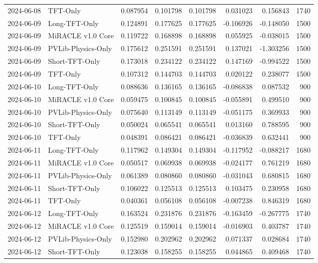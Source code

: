 \begin{tabular}{llrrrrrr}
2024-06-08 & TFT-Only & 0.087954 & 0.101798 & 0.101798 & 0.031023 & 0.156843 & 1740 \\
2024-06-09 & Long-TFT-Only & 0.124891 & 0.177625 & 0.177625 & -0.106926 & -0.148050 & 1500 \\
2024-06-09 & MiRACLE v1.0 Core & 0.119722 & 0.168898 & 0.168898 & 0.055925 & -0.038015 & 1500 \\
2024-06-09 & PVLib-Physics-Only & 0.175612 & 0.251591 & 0.251591 & 0.137021 & -1.303256 & 1500 \\
2024-06-09 & Short-TFT-Only & 0.173018 & 0.234122 & 0.234122 & 0.147169 & -0.994522 & 1500 \\
2024-06-09 & TFT-Only & 0.107312 & 0.144703 & 0.144703 & 0.020122 & 0.238077 & 1500 \\
2024-06-10 & Long-TFT-Only & 0.088636 & 0.136165 & 0.136165 & -0.086838 & 0.087532 & 900 \\
2024-06-10 & MiRACLE v1.0 Core & 0.059475 & 0.100845 & 0.100845 & -0.055891 & 0.499510 & 900 \\
2024-06-10 & PVLib-Physics-Only & 0.075640 & 0.113149 & 0.113149 & -0.051175 & 0.369933 & 900 \\
2024-06-10 & Short-TFT-Only & 0.050024 & 0.065541 & 0.065541 & 0.013160 & 0.788595 & 900 \\
2024-06-10 & TFT-Only & 0.048391 & 0.086421 & 0.086421 & -0.036839 & 0.632441 & 900 \\
2024-06-11 & Long-TFT-Only & 0.117962 & 0.149304 & 0.149304 & -0.117952 & -0.088217 & 1680 \\
2024-06-11 & MiRACLE v1.0 Core & 0.050517 & 0.069938 & 0.069938 & -0.024177 & 0.761219 & 1680 \\
2024-06-11 & PVLib-Physics-Only & 0.061389 & 0.080860 & 0.080860 & -0.031043 & 0.680815 & 1680 \\
2024-06-11 & Short-TFT-Only & 0.106022 & 0.125513 & 0.125513 & 0.103475 & 0.230958 & 1680 \\
2024-06-11 & TFT-Only & 0.040361 & 0.056108 & 0.056108 & -0.007238 & 0.846319 & 1680 \\
2024-06-12 & Long-TFT-Only & 0.163524 & 0.231876 & 0.231876 & -0.163459 & -0.267775 & 1740 \\
2024-06-12 & MiRACLE v1.0 Core & 0.125519 & 0.159014 & 0.159014 & -0.016903 & 0.403787 & 1740 \\
2024-06-12 & PVLib-Physics-Only & 0.152980 & 0.202962 & 0.202962 & 0.071337 & 0.028684 & 1740 \\
2024-06-12 & Short-TFT-Only & 0.123038 & 0.158255 & 0.158255 & 0.044865 & 0.409468 & 1740 \\

\end{tabular}

